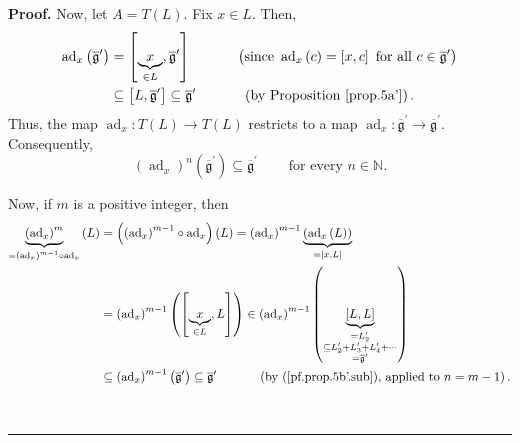 \documentclass[numbers=enddot,12pt,final,onecolumn,notitlepage]{scrartcl}%
\theoremstyle{definition}
\newenvironment{proof}[1][Proof]{\noindent\textbf{#1.} }{\ \rule{0.5em}{0.5em}}
\begin{document}
\begin{proof}
Now, let $A=T\left(  L\right)  $. Fix $x\in L$. Then,%
\begin{align*}
\operatorname*{ad}\nolimits_{x}\left(  \overline{\mathfrak{g}}^{\prime
}\right)   &  =\left[  \underbrace{x}_{\in L},\overline{\mathfrak{g}}^{\prime
}\right]  \ \ \ \ \ \ \ \ \ \ \left(  \text{since }\operatorname*{ad}%
\nolimits_{x}\left(  c\right)  =\left[  x,c\right]  \text{ for all }%
c\in\overline{\mathfrak{g}}^{\prime}\right) \\
&  \subseteq\left[  L,\overline{\mathfrak{g}}^{\prime}\right]  \subseteq
\overline{\mathfrak{g}}^{\prime}\ \ \ \ \ \ \ \ \ \ \left(  \text{by
Proposition \ref{prop.5a'}}\right)  .
\end{align*}
Thus, the map $\operatorname*{ad}\nolimits_{x}:T\left(  L\right)  \rightarrow
T\left(  L\right)  $ restricts to a map $\operatorname*{ad}\nolimits_{x}%
:\overline{\mathfrak{g}}^{\prime}\rightarrow\overline{\mathfrak{g}}^{\prime}$.
Consequently,
\begin{equation}
\left(  \operatorname*{ad}\nolimits_{x}\right)  ^{n}\left(  \overline
{\mathfrak{g}}^{\prime}\right)  \subseteq\overline{\mathfrak{g}}^{\prime
}\ \ \ \ \ \ \ \ \ \ \text{for every }n\in\mathbb{N}. \label{pf.prop.5b'.sub}%
\end{equation}


Now, if $m$ is a positive integer, then%
\begin{align}
\underbrace{\left(  \operatorname*{ad}\nolimits_{x}\right)  ^{m}}_{=\left(
\operatorname*{ad}\nolimits_{x}\right)  ^{m-1}\circ\operatorname*{ad}%
\nolimits_{x}}\left(  L\right)   &  =\left(  \left(  \operatorname*{ad}%
\nolimits_{x}\right)  ^{m-1}\circ\operatorname*{ad}\nolimits_{x}\right)
\left(  L\right)  =\left(  \operatorname*{ad}\nolimits_{x}\right)
^{m-1}\underbrace{\left(  \operatorname*{ad}\nolimits_{x}\left(  L\right)
\right)  }_{=\left[  x,L\right]  }\nonumber\\
&  =\left(  \operatorname*{ad}\nolimits_{x}\right)  ^{m-1}\left(  \left[
\underbrace{x}_{\in L},L\right]  \right)  \in\left(  \operatorname*{ad}%
\nolimits_{x}\right)  ^{m-1}\left(  \underbrace{\left[  L,L\right]
}_{\substack{=L_{2}^{\prime}\\\subseteq L_{2}^{\prime}+L_{3}^{\prime}%
+L_{4}^{\prime}+\cdots\\=\overline{\mathfrak{g}}^{\prime}}}\right) \nonumber\\
&  \subseteq\left(  \operatorname*{ad}\nolimits_{x}\right)  ^{m-1}\left(
\overline{\mathfrak{g}}^{\prime}\right)  \subseteq\overline{\mathfrak{g}%
}^{\prime}\ \ \ \ \ \ \ \ \ \ \left(  \text{by (\ref{pf.prop.5b'.sub}),
applied to }n=m-1\right)  . \label{pf.prop.5b'.sub2}%
\end{align}



\end{proof}
\end{document}
